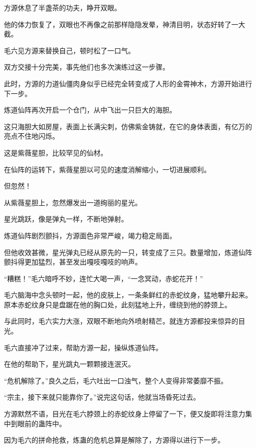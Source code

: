 
\begin{this_body}

方源休息了半盏茶的功夫，睁开双眼。

他的体力恢复了，双眼也不再像之前那样隐隐发晕，神清目明，状态好转了一大截。

毛六见方源来替换自己，顿时松了一口气。

双方交接十分完美，事先他们也多次演练过这一步骤。

此时，方源的力道仙僵肉身似乎已经完全转变成了人形的金霄神木，方源开始进行下一步。

炼道仙阵再次开启一个仓门，从中飞出一只巨大的海胆。

这只海胆大如房屋，表面上长满尖刺，仿佛紫金铸就，在它的身体表面，有亿万的亮点不住地闪烁。

这是紫薇星胆，比较罕见的仙材。

在仙阵的运转下，紫薇星胆以可见的速度消解缩小，一切进展顺利。

但忽然！

从紫薇星胆上，忽然爆发出一道绚丽的星光。

星光跳跃，像是弹丸一样，不断地弹射。

炼道仙阵剧烈颤抖，方源面色非常严峻，竭力稳定局面。

但他收效甚微，星光弹丸已经从原先的一只，转变成了三只。数量增加，炼道仙阵颤抖得更加猛烈，甚至发出嘎吱嘎吱的响声。

“糟糕！”毛六暗呼不妙，连忙大喝一声，“一念冥动，赤蛇花开！”

毛六脑海中念头顿时一起，他的皮肤上，一条条鲜红的赤蛇纹身，猛地攀升起来。原本赤蛇纹身只是盘踞在他的胸口处，此刻猛地上升，缠绕到他的脖颈上。

与此同时，毛六实力大涨，双眼不断地向外喷射精芒。就连方源都投来惊异的目光。

毛六直接冲了过来，帮助方源一起，操纵炼道仙阵。

在他的帮助下，星光跳丸一颗颗接连泯灭。

“危机解除了。”良久之后，毛六吐出一口浊气，整个人变得非常萎靡不振。

“宗主，接下来就只能靠你了。”说完这句话，他就当场昏死过去。

方源默然不语，目光在毛六脖颈上的赤蛇纹身上停留了一下，便又旋即将注意力集中到眼前的蛊阵中。

因为毛六的拼命抢救，炼蛊的危机总算是解除了，方源得以进行下一步。


\end{this_body}
